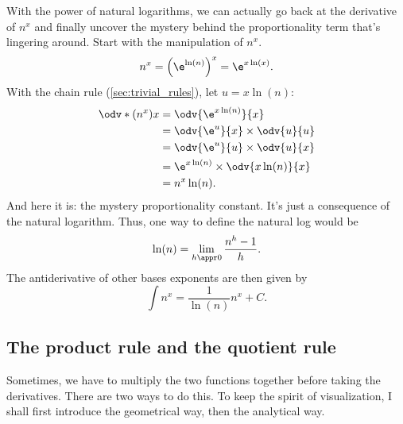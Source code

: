With the power of natural logarithms, we can actually go back at the derivative of $n^x$ and finally uncover the mystery behind the proportionality term that's lingering around. Start with the manipulation of $n^x$.
\begin{equation}
	n^x = \left(\e^{\ln(n)}\right)^x = \e^{x\ln(x)}.
\end{equation}
With the chain rule (\cref{sec:trivial_rules}), let $u = x\ln(n)$:
\begin{align*}
	\odv*{(n^x)}{x} & = \odv{\e^{x\ln(n)}}{x}                \\
	                & = \odv{\e^u}{x} \times \odv{u}{u}      \\
	                & = \odv{\e^u}{u} \times \odv{u}{x}      \\
	                & = \e^{x\ln(n)} \times \odv{x\ln(n)}{x} \\
	                & = n^x\ln(n).
\end{align*}
And here it is: the mystery proportionality constant. It's just a consequence of the natural logarithm. Thus, one way to define the natural log would be
\begin{equation}
	\ln(n) = \lim_{h \appr 0}\frac{n^h - 1}{h}.
\end{equation}
The antiderivative of other bases exponents are then given by
\begin{equation}
	\int n^x = \frac{1}{\ln(n)}n^x + C.
\end{equation}

\subsection{The product rule and the quotient rule}

Sometimes, we have to multiply the two functions together before taking the derivatives. There are two ways to do this. To keep the spirit of visualization, I shall first introduce the geometrical way, then the analytical way.

